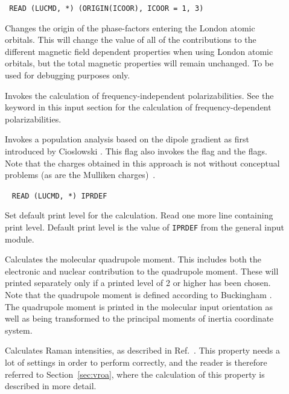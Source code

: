 \begin{description}
\item[]\verb| |\newline
\verb|READ (LUCMD, *) (ORIGIN(ICOOR), ICOOR = 1, 3)|

Changes the origin of the phase-factors entering the London atomic
orbitals. This will change the value of all of the contributions to
the different magnetic field dependent properties when using London
atomic orbitals, but the total magnetic properties will remain
unchanged. To be used for debugging purposes only.

\item[] Invokes the calculation of frequency-independent
polarizabilities. See the keyword  in
this input section for the calculation of frequency-dependent
polarizabilities.

\item[] Invokes a population analysis based on the 
dipole gradient as first introduced by Cioslowski \cite{jcjacs111}.
This flag also invokes the  flag and the  flags. Note that the charges obtained in this approach is not without conceptual problems (as are the Mulliken charges)~\cite{hskrpoajcp120}.

\item[]\verb| |
\newline
\verb|READ (LUCMD, *) IPRDEF|

Set default print level for the calculation.  Read one
more line containing print level. Default print level is the
value of \verb|IPRDEF| from the general input module.

\item[] Calculates the molecular quadrupole
moment. This
includes both the electronic and nuclear contribution to the
quadrupole moment. These will printed separately only if a printed
level of 2 or higher has been chosen. Note that the quadrupole moment is
defined according to Buckingham \cite{adbacp12}. The quadrupole moment
is printed in the molecular input orientation as well as being 
transformed to the principal moments of inertia coordinate system.

\item[] Calculates Raman intensities, as described in 
Ref.~\cite{thkrklbpjjofd99}. This property needs a lot of settings
in order to perform correctly, and the reader is therefore referred to
Section~\ref{sec:vroa}, where the
calculation of this property is described in more detail.


\end{description}
